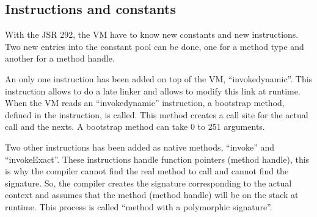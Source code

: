 \documentclass{sigplanconf}
\def \Jsr{JSR\xspace}
\def \JSR{\Jsr 292\xspace}
\def \VM{VM\xspace}
\begin{document}
% 


    \subsection{Instructions and constants}
      With the \JSR, the \VM have to know new constants and new instructions.
      Two new entries into the constant pool can be done, one for a method type and another for a method handle.

      An only one instruction has been added on top of the \VM, ``invokedynamic''.
      This instruction allows to do a late linker and allows to modify this link at runtime.
      When the \VM reads an ``invokedynamic'' instruction, a bootstrap method, defined in the instruction, is called.
      This method creates a call site for the actual call and the nexts.
      A bootstrap method can take 0 to 251 arguments.

      Two other instructions has been added as native methods, ``invoke'' and ``invokeExact''.
      These instructions handle function pointers (method handle),
      this is why the compiler cannot find the real method to call and cannot find the signature.
      So, the compiler creates the signature corresponding to the actual context
      and assumes that the method (method handle) will be on the stack at runtime.
      This process is called ``method with a polymorphic signature''.

\end{document}
